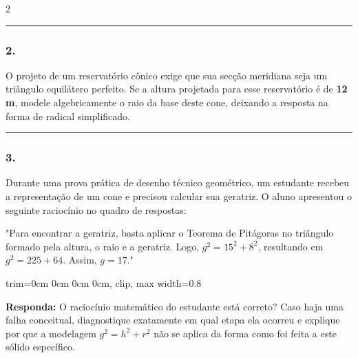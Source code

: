 \documentclass[twoside, 10pt, a4paper]{article}
\newlength{\espacoPreQuestao}\setlength{\espacoPreQuestao}{0.1cm}
\newlength{\espacoQuestao}\setlength{\espacoQuestao}{0.2cm}
\newlength{\larguraTikz}
\begin{document}
\begin{multicols*}{2}
\noindent\textcolor{CorLinha}{\rule{\linewidth}{0.5pt}} 
\par\vspace{\espacoPreQuestao}
\subsubsection*{2.} O projeto de um reservatório cônico exige que sua secção meridiana seja um triângulo equilátero perfeito. Se a altura projetada para esse reservatório é de \textbf{12 m}, modele algebricamente o raio da base deste cone, deixando a resposta na forma de radical simplificado.
\par\vspace{\espacoQuestao}

\noindent\textcolor{CorLinha}{\rule{\linewidth}{0.5pt}}
\par\vspace{\espacoPreQuestao}
\subsubsection*{3.} Durante uma prova prática de desenho técnico geométrico, um estudante recebeu a representação de um cone e precisou calcular sua geratriz. O aluno apresentou o seguinte raciocínio no quadro de respostas:

"Para encontrar a geratriz, basta aplicar o Teorema de Pitágoras no triângulo formado pela altura, o raio e a geratriz. Logo, $ g^2 = 15^2 + 8^2 $, resultando em $ g^2 = 225 + 64 $. Assim, $ g = 17 $."

\begin{center}
\begin{adjustbox}{trim=0cm 0cm 0cm 0cm, clip, max width=0.8\larguraTikz}
\end{adjustbox}
\end{center}
\begin{boxresponda}
\textbf{Responda:} O raciocínio matemático do estudante está correto? Caso haja uma falha conceitual, diagnostique exatamente em qual etapa ela ocorreu e explique por que a modelagem $ g^2 = h^2 + r^2 $ não se aplica da forma como foi feita a este sólido específico.
\end{boxresponda}
\par\vspace{\espacoQuestao}


\end{multicols*}
\end{document}
